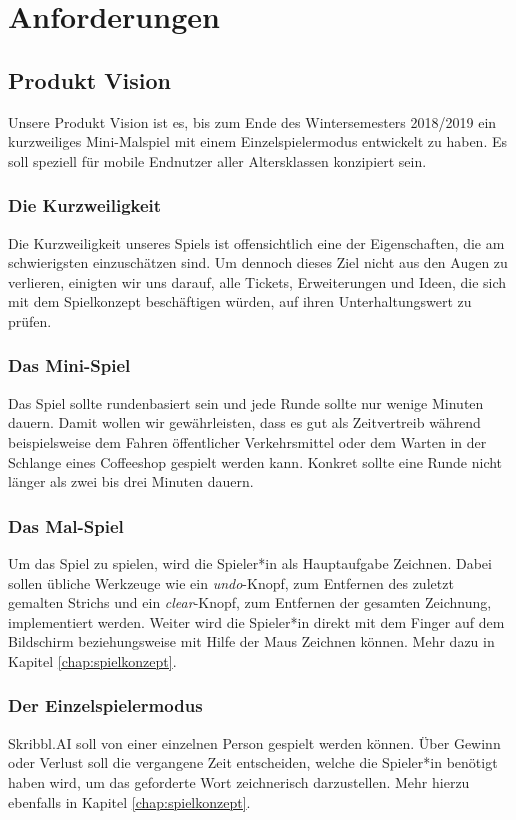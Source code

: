 \documentclass[11pt]{article}
\begin{document}
\section{Anforderungen}
\label{chap: Anforderungen}
\subsection{Produkt Vision}
\label{chap: productVision}
Unsere Produkt Vision ist es, bis zum Ende des Wintersemesters 2018/2019 ein kurzweiliges Mini-Malspiel mit einem Einzelspielermodus entwickelt zu haben. Es soll speziell für mobile Endnutzer aller Altersklassen konzipiert sein.
\subsubsection{Die Kurzweiligkeit}
Die Kurzweiligkeit unseres Spiels ist offensichtlich eine der Eigenschaften, die am schwierigsten einzuschätzen sind. Um dennoch dieses Ziel nicht aus den Augen zu verlieren, einigten wir uns darauf, alle Tickets, Erweiterungen und Ideen, die sich mit dem Spielkonzept beschäftigen würden, auf ihren Unterhaltungswert zu prüfen.
\subsubsection{Das Mini-Spiel}
Das Spiel sollte rundenbasiert sein und jede Runde sollte nur wenige Minuten dauern. Damit wollen wir gewährleisten, dass es gut als Zeitvertreib während beispielsweise dem Fahren öffentlicher Verkehrsmittel oder dem Warten in der Schlange eines Coffeeshop gespielt werden kann. Konkret sollte eine Runde nicht länger als zwei bis drei Minuten dauern.
\subsubsection{Das Mal-Spiel}
Um das Spiel zu spielen, wird die Spieler*in als Hauptaufgabe Zeichnen. Dabei sollen übliche Werkzeuge wie ein \textit{undo}-Knopf, zum Entfernen des zuletzt gemalten Strichs und ein \textit{clear}-Knopf, zum Entfernen der gesamten Zeichnung, implementiert werden. Weiter wird die Spieler*in direkt mit dem Finger auf dem Bildschirm beziehungsweise mit Hilfe der Maus Zeichnen können. Mehr dazu in Kapitel \ref{chap:spielkonzept}.
\subsubsection{Der Einzelspielermodus}
Skribbl.AI soll von einer einzelnen Person gespielt werden können. Über Gewinn oder Verlust soll die vergangene Zeit entscheiden, welche die Spieler*in benötigt haben wird, um das geforderte Wort zeichnerisch darzustellen. Mehr hierzu ebenfalls in Kapitel \ref{chap:spielkonzept}.
\end{document}
